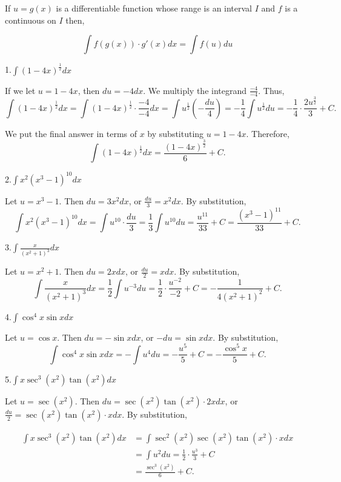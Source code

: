 \documentclass[
  letterpaper,
  DIV=11,
  numbers=noendperiod]{scrartcl}
\theoremstyle{definition}
\theoremstyle{plain}
\theoremstyle{remark}
\begin{document}
If \(u=g(x)\) is a differentiable function whose range is an interval
\(I\) and \(f\) is a continuous on \(I\) then,

\[
\int f(g(x))\cdot g'(x)dx = \int f(u)du
\]

1.\(\int \left(1-4x\right)^\frac{1}{2}dx\)

If we let \(u=1-4x\), then \(du=-4dx\). We multiply the integrand
\(\frac{-4}{-4}\). Thus, \[
\int \left(1-4x\right)^\frac{1}{2}dx = \int \left(1-4x\right)^\frac{1}{2}\cdot \frac{-4}{-4}dx = \int u^\frac{1}{2} \left( -\frac{du}{4} \right)= -\frac{1}{4} \int u^\frac{1}{2} du = -\frac{1}{4}\cdot \frac{2u^\frac{3}{2}}{3} + C. \]

We put the final answer in terms of \(x\) by substituting \(u=1-4x\).
Therefore, \[
\int \left(1-4x\right)^\frac{1}{2} dx = \frac{\left(1-4x\right)^\frac{3}{2}}{6} + C.\]

2.\(\int x^2\left(x^3-1\right)^{10} dx\)

Let \(u=x^3-1\). Then \(du=3x^2dx\), or \(\frac{du}{3}=x^2 dx\). By
substitution, \[
\int x^2\left(x^3-1\right)^{10} dx = \int u^{10}\cdot \frac{du}{3}= \frac{1}{3}\int u^{10}du=\frac{u^{11}}{33} + C= \frac{\left(x^3-1\right)^{11}}{33}+ C.
\]

3.\(\int \frac{x}{\left(x^2+1\right)^3} dx\)

Let \(u=x^2+1\). Then \(du=2xdx\), or \(\frac{du}{2}=xdx\). By
substitution, \[
\int \frac{x}{\left(x^2+1\right)^3}dx=\frac{1}{2}\int u^{-3}du=\frac{1}{2}\cdot \frac{u^{-2}}{-2}+C=-\frac{1}{4\left(x^2+1\right)^2}+C.
\]

4.\(\int \cos^4 x \sin xdx\)

Let \(u=\cos x\). Then \(du=-\sin x dx\), or \(-du=\sin xdx\). By
substitution, \[
\int \cos^4 x \sin xdx=-\int u^4 du=-\frac{u^5}{5}+C=-\frac{\cos^5 x}{5}+C.
\]

5.\(\int x \sec^3 \left( x^2 \right)\tan\left(x^2\right)dx\)

Let \(u=\sec\left (x^2\right)\). Then
\(du=\sec\left(x^2\right)\tan\left(x^2\right)\cdot 2xdx\), or
\(\frac{du}{2}=\sec\left (x^2\right)\tan\left(x^2\right)\cdot xdx\). By
substitution,

\[
\begin{aligned}
\int x\sec^3 \left(x^2\right)\tan\left(x^2\right)dx &= \int \sec^2 \left(x^2\right)\sec\left(x^2\right)\tan\left(x^2\right)\cdot xdx \\ &= \int u^2du=\frac{1}{2}\cdot \frac{u^3}{3}+C \\& = \frac{\sec^3 \left(x^2\right)}{6} + C.
\end{aligned}
\]
\end{document}

